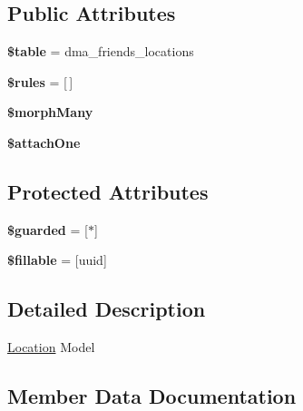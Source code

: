 \subsection*{Public Attributes}
\begin{DoxyCompactItemize}
\item 
\hypertarget{classDMA_1_1Friends_1_1Models_1_1Location_ac1f41b316e50581d95f80655e36b7f9d}{}{\bfseries \$table} = \textquotesingle{}dma\+\_\+friends\+\_\+locations\textquotesingle{}\label{classDMA_1_1Friends_1_1Models_1_1Location_ac1f41b316e50581d95f80655e36b7f9d}

\item 
\hypertarget{classDMA_1_1Friends_1_1Models_1_1Location_a3df0019a82eb74c240408878329baa2c}{}{\bfseries \$rules} = \mbox{[}$\,$\mbox{]}\label{classDMA_1_1Friends_1_1Models_1_1Location_a3df0019a82eb74c240408878329baa2c}

\item 
{\bfseries \$morph\+Many}
\item 
{\bfseries \$attach\+One}
\end{DoxyCompactItemize}
\subsection*{Protected Attributes}
\begin{DoxyCompactItemize}
\item 
\hypertarget{classDMA_1_1Friends_1_1Models_1_1Location_a248021f938f61b3ccce7e20b259e39e9}{}{\bfseries \$guarded} = \mbox{[}\textquotesingle{}$\ast$\textquotesingle{}\mbox{]}\label{classDMA_1_1Friends_1_1Models_1_1Location_a248021f938f61b3ccce7e20b259e39e9}

\item 
\hypertarget{classDMA_1_1Friends_1_1Models_1_1Location_aaa75ba74c2a24c4e42b109b0b2c82ca0}{}{\bfseries \$fillable} = \mbox{[}\textquotesingle{}uuid\textquotesingle{}\mbox{]}\label{classDMA_1_1Friends_1_1Models_1_1Location_aaa75ba74c2a24c4e42b109b0b2c82ca0}

\end{DoxyCompactItemize}


\subsection{Detailed Description}
\hyperlink{classDMA_1_1Friends_1_1Models_1_1Location}{Location} Model 

\subsection{Member Data Documentation}
\hypertarget{classDMA_1_1Friends_1_1Models_1_1Location_a4565a1d2e52265bc6399d13dab84c8c9}{}
